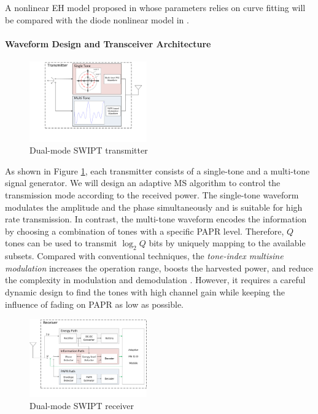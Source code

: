 \documentclass[conference]{IEEEtran}
\begin{document}
A nonlinear EH model proposed in \cite{Boshkovska2015} whose parameters relies on curve fitting will be compared with the diode nonlinear model in \cite{Clerckx2016}.

\paragraph{Waveform Design and Transceiver Architecture}

\begin{figure}
  \centering
    \includegraphics[width=0.45\textwidth]{transmitter}
  \caption{Dual-mode SWIPT transmitter \cite{Park2018}}
  \label{fig:transmitter}
\end{figure}

As shown in Figure \ref{fig:transmitter}, each transmitter consists of a single-tone and a multi-tone signal generator. We will design an adaptive MS algorithm to control the transmission mode according to the received power. The single-tone waveform modulates the amplitude and the phase simultaneously and is suitable for high rate transmission. In contrast, the multi-tone waveform encodes the information by choosing a combination of tones with a specific PAPR level. Therefore, $Q$ tones can be used to transmit ${\log _2}Q$ bits by uniquely mapping to the available subsets. Compared with conventional techniques, the \textit{tone-index multisine modulation} increases the operation range, boosts the harvested power, and reduce the complexity in modulation and demodulation \cite{Krikidis2019}. However, it requires a careful dynamic design to find the tones with high channel gain while keeping the influence of fading on PAPR as low as possible.

\begin{figure}
  \centering
    \includegraphics[width=0.45\textwidth]{receiver}
  \caption{Dual-mode SWIPT receiver \cite{Park2018}}
  \label{fig:receiver}
\end{figure}
\end{document}
